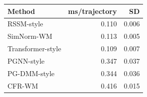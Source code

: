 \begin{tabular}{lrr}
\toprule
Method & ms/trajectory & SD \\
\midrule
RSSM-style & 0.110 & 0.006 \\
SimNorm-WM & 0.113 & 0.005 \\
Transformer-style & 0.109 & 0.007 \\
PGNN-style & 0.347 & 0.037 \\
PG-DMM-style & 0.344 & 0.036 \\
CFR-WM & 0.416 & 0.015 \\
\bottomrule
\end{tabular}
